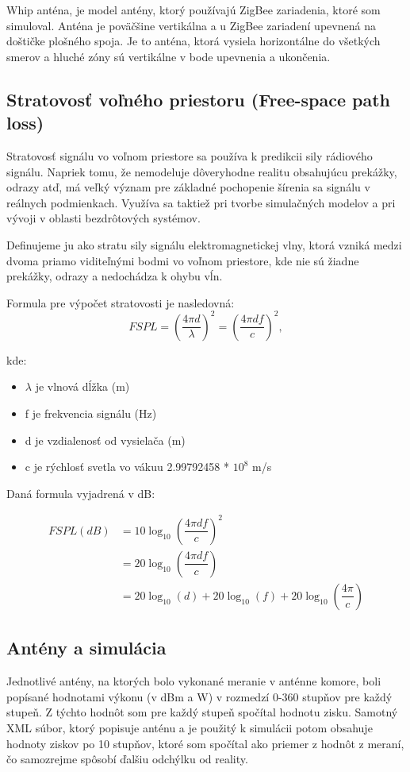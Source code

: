 \documentclass[11pt,twoside,a4paper]{book}
\begin{document}
\noindent Whip anténa, je model antény, ktorý používajú ZigBee zariadenia, ktoré som simuloval. Anténa je poväčšine vertikálna a u ZigBee zariadení upevnená na doštičke plošného spoja. Je to anténa, ktorá vysiela horizontálne do všetkých smerov a hluché zóny sú vertikálne v bode upevnenia a ukončenia.

\subsection{Stratovosť voľného priestoru (Free-space path loss)}

Stratovosť signálu vo voľnom priestore sa používa k predikcii sily rádiového signálu. Napriek tomu, že nemodeluje dôveryhodne realitu obsahujúcu prekážky, odrazy atď, má veľký význam pre základné pochopenie šírenia sa signálu v reálnych podmienkach. Využíva sa taktiež pri tvorbe simulačných modelov a pri vývoji v oblasti bezdrôtových systémov.

Definujeme ju ako stratu sily signálu elektromagnetickej vlny, ktorá vzniká medzi dvoma priamo viditeľnými bodmi vo voľnom priestore, kde nie sú žiadne prekážky, odrazy a nedochádza k ohybu vĺn.

Formula pre výpočet stratovosti je nasledovná:
$$FSPL =  \left(\dfrac{4 \pi d}{\lambda}\right)^{2}  = \left(\dfrac{4 \pi d f}{c}\right)^{2},$$


kde:
\begin{itemize}
 \item $\lambda$ je vlnová dĺžka (m)
 \item f je frekvencia signálu (Hz)
 \item d je vzdialenosť od vysielača (m)
 \item c je rýchlosť svetla vo vákuu 2.99792458 * $10^{8}$ m/s
\end{itemize}

Daná formula vyjadrená v dB:

\begin{align*}
FSPL(dB) &= 10 \log_{10}\left(\dfrac{4 \pi df}{c} \right)^{2} \\
&= 20 \log_{10}\left(\dfrac{4 \pi df }{c} \right) \\
&= 20 \log_{10}(d) + 20 \log_{10}(f) + 20 \log_{10} \left(\dfrac{4 \pi}{c}\right)
\end{align*}


\subsection{Antény a simulácia}
Jednotlivé antény, na ktorých bolo vykonané meranie v anténne komore, boli popísané hodnotami výkonu (v dBm a W) v rozmedzí 0-360 stupňov pre každý stupeň. Z týchto hodnôt som pre každý stupeň spočítal hodnotu zisku. Samotný XML súbor, ktorý popisuje anténu a je použitý k simulácii potom obsahuje hodnoty ziskov po 10 stupňov, ktoré som spočítal ako priemer z hodnôt z meraní, čo samozrejme spôsobí ďalšiu odchýlku od reality. \\
\end{document}
